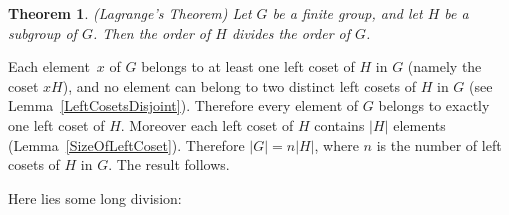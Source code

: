 \documentclass[12pt]{article}
\newtheorem{theorem}{Theorem}[section]
\newenvironment{proof}[1][Proof]{\begin{trivlist} %
\item[\hskip \labelsep {\bfseries #1}]}{\end{trivlist}}
\newcommand{\qed}{\nobreak \ifvmode \relax \else %
      \ifdim\lastskip<1.5em \hskip-\lastskip %
      \hskip1.5em plus0em minus0.5em \fi \nobreak %
      \vrule height0.75em width0.5em depth0.25em\fi}
\begin{document}
\begin{theorem}
\emph{(Lagrange's Theorem)}
\label{Lagrange}
Let $G$ be a finite group, and let $H$ be a subgroup
of $G$.  Then the order of $H$ divides the order of $G$.
\end{theorem}

\begin{proof}
Each element~$x$ of $G$ belongs to at least one left coset
of $H$ in $G$ (namely the coset $xH$), and no element
can belong to two distinct left cosets of $H$ in $G$
(see Lemma~\ref{LeftCosetsDisjoint}).  Therefore every
element of $G$ belongs to exactly one left coset of $H$.
Moreover each left coset of $H$ contains $|H|$ elements
(Lemma~\ref{SizeOfLeftCoset}).  Therefore $|G| = n |H|$,
where $n$ is the number of left cosets of $H$ in $G$.
The result follows.\qed
\end{proof}

Here lies some long division:


\end{document}
